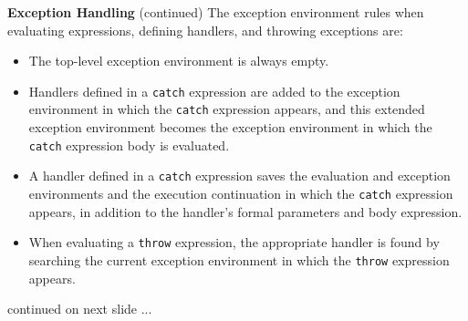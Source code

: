 \begin{minipage}[t]{\sw}
\slidenumber
\LARGE
{\bf Exception Handling} (continued)\exx
The exception environment rules
when evaluating expressions,
defining handlers,
and throwing exceptions are:
\begin{itemize}
\parskip 0ex
\item
  The top-level exception environment is always empty.
\item
  Handlers defined in a \verb'catch' expression are added
  to the exception environment in which the \verb'catch' expression appears,
  and this extended exception environment becomes the exception environment
  in which the \verb'catch' expression body is evaluated.
\item
  A handler defined in a \verb'catch' expression
  saves the evaluation and exception environments
  and the execution continuation
  in which the \verb'catch' expression appears,
  in addition to the handler's formal parameters and body expression.
\item
  When evaluating a \verb'throw' expression,
  the appropriate handler is found by searching
  the current exception environment
  in which the \verb'throw' expression appears.
\end{itemize}

continued on next slide ...


\end{minipage}

